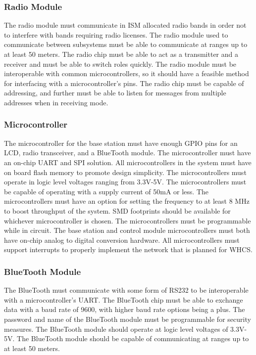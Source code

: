 \subsubsection{Radio Module}

The radio module must communicate in ISM allocated radio bands in order not to
interfere with bands requiring radio licenses. The radio module used to
communicate between subsystems must be able to communicate at ranges up to at
least 50 meters. The radio chip must be able to act as a transmitter and a
receiver and must be able to switch roles quickly.  The radio module must be
interoperable with common microcontrollers, so it should have a feasible method
for interfacing with a microcontroller{}'s pins. The radio chip must be capable
of addressing, and further must be able to listen for messages from multiple
addresses when in receiving mode.

\subsubsection{Microcontroller}

The microcontroller for the base station must have enough GPIO pins for an LCD,
radio transceiver, and a BlueTooth module. The microcontroller must have an
on{}-chip UART and SPI solution. All microcontrollers in the system must have
on board flash memory to promote design simplicity. The microcontrollers must
operate in logic level voltages ranging from 3.3V{}-5V. The microcontrollers
must be capable of operating with a supply current of 50mA or less. The
microcontrollers must have an option for setting the frequency to at least 8
MHz to boost throughput of the system. SMD footprints should be available for
whichever microcontroller is chosen. The microcontrollers must be programmable
while in circuit. The base station and control module microcontrollers must
both have on{}-chip analog to digital conversion hardware. All microcontrollers
must support interrupts to properly implement the network that is planned for
WHCS.

\subsubsection{BlueTooth Module}

The BlueTooth must communicate with some form of RS232 to be interoperable with
a microcontroller{}'s UART. The BlueTooth chip must be able to exchange data
with a baud rate of 9600, with higher baud rate options being a plus. The
password and name of the BlueTooth module must be programmable for security
measures. The BlueTooth module should operate at logic level voltages of
3.3V{}-5V. The BlueTooth module should be capable of communicating at ranges up
to at least 50 meters.

